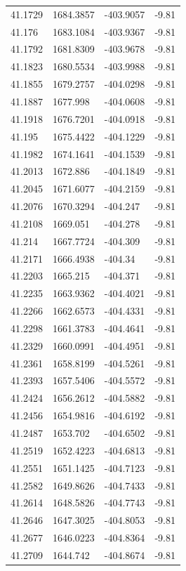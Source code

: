 \begin{table}[H]
\begin{tabular}{llll}
41.1729 & 1684.3857 & -403.9057 & -9.81 \\
41.176 & 1683.1084 & -403.9367 & -9.81 \\
41.1792 & 1681.8309 & -403.9678 & -9.81 \\
41.1823 & 1680.5534 & -403.9988 & -9.81 \\
41.1855 & 1679.2757 & -404.0298 & -9.81 \\
41.1887 & 1677.998 & -404.0608 & -9.81 \\
41.1918 & 1676.7201 & -404.0918 & -9.81 \\
41.195 & 1675.4422 & -404.1229 & -9.81 \\
41.1982 & 1674.1641 & -404.1539 & -9.81 \\
41.2013 & 1672.886 & -404.1849 & -9.81 \\
41.2045 & 1671.6077 & -404.2159 & -9.81 \\
41.2076 & 1670.3294 & -404.247 & -9.81 \\
41.2108 & 1669.051 & -404.278 & -9.81 \\
41.214 & 1667.7724 & -404.309 & -9.81 \\
41.2171 & 1666.4938 & -404.34 & -9.81 \\
41.2203 & 1665.215 & -404.371 & -9.81 \\
41.2235 & 1663.9362 & -404.4021 & -9.81 \\
41.2266 & 1662.6573 & -404.4331 & -9.81 \\
41.2298 & 1661.3783 & -404.4641 & -9.81 \\
41.2329 & 1660.0991 & -404.4951 & -9.81 \\
41.2361 & 1658.8199 & -404.5261 & -9.81 \\
41.2393 & 1657.5406 & -404.5572 & -9.81 \\
41.2424 & 1656.2612 & -404.5882 & -9.81 \\
41.2456 & 1654.9816 & -404.6192 & -9.81 \\
41.2487 & 1653.702 & -404.6502 & -9.81 \\
41.2519 & 1652.4223 & -404.6813 & -9.81 \\
41.2551 & 1651.1425 & -404.7123 & -9.81 \\
41.2582 & 1649.8626 & -404.7433 & -9.81 \\
41.2614 & 1648.5826 & -404.7743 & -9.81 \\
41.2646 & 1647.3025 & -404.8053 & -9.81 \\
41.2677 & 1646.0223 & -404.8364 & -9.81 \\
41.2709 & 1644.742 & -404.8674 & -9.81 \\

\end{tabular}
\end{table}
